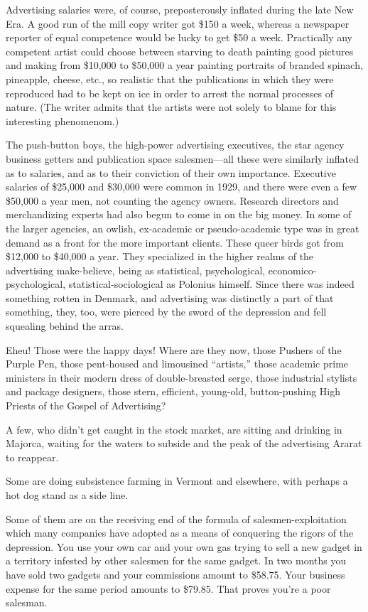 \documentclass[nohyper,openany,nobib]{tufte-book}
\begin{document}
Advertising salaries were, of course, preposterously inflated during the
late New Era. A good run of the mill copy writer got \$150 a week,
whereas a newspaper reporter of equal competence would be lucky to get
\$50 a week. Practically any competent artist could choose between
starving to death painting good pictures and making from \$10,000 to
\$50,000 a year painting portraits of branded spinach, pineapple,
cheese, etc., so realistic that the publications in which they were
reproduced had to be kept on ice in order to arrest the normal processes
of nature. (The writer admits that the artists were not solely to blame
for this interesting phenomenom.)

The push-button boys, the high-power advertising executives, the star
agency business getters and publication space salesmen---all these were
similarly inflated as to salaries, and as to their conviction of their
own importance. Executive salaries of \$25,000 and \$30,000 were common
in 1929, and there were even a few \$50,000 a year men, not counting the
agency owners. Research directors and merchandizing experts had also
begun to come in on the big money. In some of the larger agencies, an
owlish, ex-academic or pseudo-academic type was in great demand as a
front for the more important clients. These queer birds got from
\$12,000 to \$40,000 a year. They specialized in the higher realms of
the advertising make-believe, being as statistical, psychological,
economico-psychological, statistical-sociological as Polonius himself.
Since there was indeed something rotten in Denmark, and advertising was
distinctly a part of that something, they, too, were pierced by the
sword of the depression and fell squealing behind the arras.

Eheu! Those were the happy days! Where are they now, those Pushers of
the Purple Pen, those pent-housed and limousined ``artists,'' those
academic prime ministers in their modern dress of double-breasted serge,
those industrial stylists and package designers, those stern, efficient,
young-old, button-pushing High Priests of the Gospel of Advertising?

A few, who didn't get caught in the stock market, are sitting and
drinking in Majorca, waiting for the waters to subside and the peak of
the advertising Ararat to reappear.

Some are doing subsistence farming in Vermont and elsewhere, with
perhaps a hot dog stand as a side line.

Some of them are on the receiving end of the formula of
salesmen-exploitation which many companies have adopted as a means of
conquering the rigors of the depression. You use your own car and your
own gas trying to sell a new gadget in a territory infested by other
salesmen for the same gadget. In two months you have sold two gadgets
and your commissions amount to \$58.75. Your business expense for the
same period amounts to \$79.85. That proves you're a poor salesman.
\end{document}
